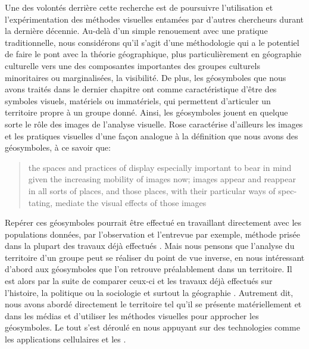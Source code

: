 Une des volontés derrière cette recherche est de poursuivre l'utilisation et l'expérimentation des méthodes visuelles entamées par d'autres chercheurs durant la dernière décennie.
Au-delà d'un simple renouement avec une pratique traditionnelle, nous considérons qu'il s'agit d'une méthodologie qui a le potentiel de faire le pont avec la théorie géographique, plus particulièrement en géographie culturelle vers une des composantes importantes des groupes culturels minoritaires ou marginalisées, la visibilité.
De plus, les géosymboles que nous avons traités dans le dernier chapitre ont comme caractéristique d'être des symboles visuels, matériels ou immatériels, qui permettent d'articuler un territoire propre à un groupe donné.
Ainsi, les géosymboles jouent en quelque sorte le rôle des images de l'analyse visuelle.
Rose caractérise d'ailleurs les images et les pratiques visuelles d'une façon analogue à la définition que nous avons des géosymboles, à ce savoir que: \foreignblockquote{english}[{\cite[32]{Rose2012}}][.]{\textelp{} the spaces and practices of display  especially important to bear in mind given the increasing mobility of images now; images appear and reappear in all sorts of places, and those places, with their particular ways of spectating, mediate the visual effects of those images}.
Repérer ces géosymboles pourrait être effectué en travaillant directement avec les populations données, par l'observation et l'entrevue par exemple, méthode prisée dans la plupart des travaux déjà effectués \citep[][pour ne citer que ceux-ci]{Giraud2014, Podmore2015a, Higgins1999}.
Mais nous pensons que l'analyse du territoire d'un groupe peut se réaliser du point de vue inverse, en nous intéressant d'abord aux géosymboles que l'on retrouve préalablement dans un territoire.
Il est alors par la suite de comparer ceux-ci et les travaux déjà effectués sur l'histoire, la politique ou la sociologie et surtout la géographie \lgbt{}.
Autrement dit, nous avons abordé directement le territoire tel qu'il se présente matériellement et dans les médias \lgbt{} et d'utiliser les méthodes visuelles pour approcher les géosymboles.
Le tout s'est déroulé en nous appuyant sur des technologies comme les applications cellulaires et les \sig.


